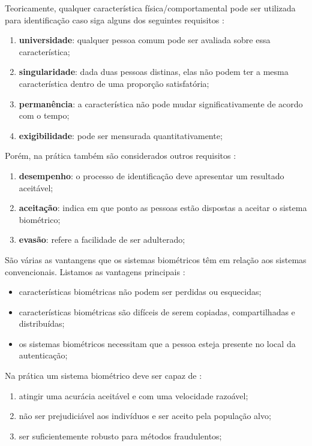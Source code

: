 Teoricamente, qualquer característica física/comportamental pode ser utilizada para identificação caso siga alguns dos seguintes requisitos \cite{milene}: 

	\begin{enumerate}
		\item \textbf{universidade}: qualquer pessoa comum pode ser avaliada sobre essa característica;
		\item \textbf{singularidade}: dada duas pessoas distinas, elas não podem ter a mesma característica dentro de uma proporção satisfatória;
		\item \textbf{permanência}: a característica não pode mudar significativamente de acordo com o tempo;
		\item \textbf{exigibilidade}: pode ser mensurada quantitativamente;
	\end{enumerate}

Porém, na prática também são considerados outros requisitos \cite{milene}:

	\begin{enumerate}
		\item \textbf{desempenho}: o processo de identificação deve apresentar um resultado aceitável;
		\item \textbf{aceitação}: indica em que ponto as pessoas estão dispostas a aceitar o sistema biométrico;
		\item \textbf{evasão}: refere a facilidade de ser adulterado;
	\end{enumerate}

São várias as vantangens que os sistemas biométricos têm em relação aos sistemas convencionais. Listamos as vantagens principais \cite{drovetto}:
	
	\begin{itemize}
		\item características biométricas não podem ser perdidas ou esquecidas;
		\item características biométricas são difíceis de serem copiadas, compartilhadas e distribuídas;
		\item os sistemas biométricos necessitam que a pessoa esteja presente no local da autenticação;
	\end{itemize}

Na prática um sistema biométrico deve ser capaz de \cite{hong}:
		
	\begin{enumerate}
		\item atingir uma acurácia aceitável e com uma velocidade razoável;
		\item não ser prejudiciável aos indivíduos e ser aceito pela população alvo;
		\item ser suficientemente robusto para métodos fraudulentos;
	\end{enumerate}

